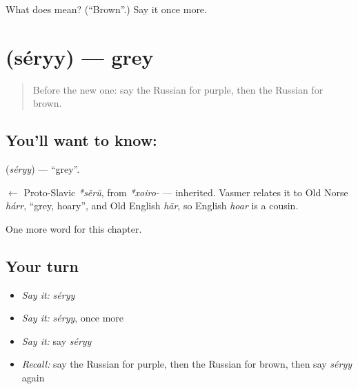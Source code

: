 \begin{tcolorbox}[breakable,colback=teal!4,colframe=teal!35!black,title={Before you move on}]
What does  mean? (\textquotedblleft{}Brown\textquotedblright{}.) Say it once more.
\end{tcolorbox}
\section[\texorpdfstring{\ru{серый} (séryy)}{серый (séryy)}]{ (séryy) — grey}

\label{lesson:RU-C124-grey}



\begin{quote}
Before the new one: say the Russian for purple, then the Russian for brown.
\end{quote}

\subsection*{You'll want to know: }
\textbf{} (\emph{séryy}) — \textquotedblleft{}grey\textquotedblright{}.

\begin{cousinweb}
\textbf{} $\leftarrow$ Proto-Slavic \emph{*sěrŭ}, from \emph{*xoiro-} — inherited. Vasmer relates it to Old Norse \emph{hárr}, \textquotedblleft{}grey, hoary\textquotedblright{}, and Old English \emph{hār}, so English \emph{hoar} is a cousin.
\end{cousinweb}

\begin{grammarlens}[title={What you've built}]
One more word for this chapter.
\end{grammarlens}

\subsection*{Your turn}
\begin{itemize}
\raggedright
  \item \emph{Say it:} \emph{séryy}
  \item \emph{Say it:} \emph{séryy}, once more
  \item \emph{Say it:} say \emph{séryy}
  \item \emph{Recall:} say the Russian for purple, then the Russian for brown, then say \emph{séryy} again
\end{itemize}

